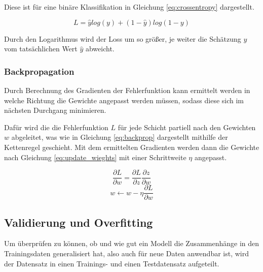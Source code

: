 Diese ist für eine binäre Klassifikation in Gleichung
\ref{eq:crossentropy} dargestellt.

\begin{equation}
    \label{eq:crossentropy}
    L = \hat{y}log(y) + (1 - \hat{y})log(1 - y)
\end{equation}

Durch den Logarithmus wird der Loss um so größer,
je weiter die Schätzung $y$ vom 
tatsächlichen Wert $\hat{y}$ abweicht.

% 


\subsubsection{Backpropagation}

Durch Berechnung des Gradienten der Fehlerfunktion kann ermittelt 
werden in welche Richtung die Gewichte angepasst werden müssen,
sodass diese sich im nächsten Durchgang minimieren.

Dafür wird die die Fehlerfunktion $L$ für jede Schicht partiell nach den 
Gewichten $w$ abgeleitet, was wie in Gleichung \ref{eq:backprop}
dargestellt mithilfe der Kettenregel geschieht.
Mit dem ermittelten Gradienten werden
dann die Gewichte nach Gleichung \ref{eq:update_wieghts}
mit einer Schrittweite $\eta$ angepasst.


\begin{equation}
    \label{eq:backprop}
    \frac{\partial L}{\partial w} = \frac{\partial L}{\partial z}\frac{\partial z}{\partial w}
\end{equation}
\begin{equation}
    \label{eq:update_wieghts}
    w  \leftarrow w - \eta \frac{\partial L}{\partial w}
\end{equation}
\vspace{1cm}



\subsection{Validierung und Overfitting}\label{subsec:validation}

Um überprüfen zu können, ob und wie gut ein Modell die Zusammenhänge
in den Trainingsdaten generalisiert hat, also auch für neue Daten
anwendbar ist,
wird der Datensatz in einen Trainings- und einen Testdatensatz aufgeteilt.

